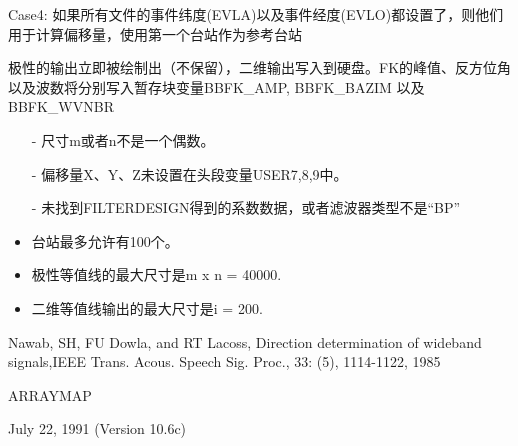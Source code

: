 Case4: 如果所有文件的事件纬度(EVLA)以及事件经度(EVLO)都设置了，则他们用于计算偏移量，使用第一个台站作为参考台站

极性的输出立即被绘制出（不保留），二维输出写入到硬盘。FK的峰值、反方位角以及波数将分别写入暂存块变量BBFK\_AMP, BBFK\_BAZIM 以及BBFK\_WVNBR

\begin{itemize}
\item[-]尺寸m或者n不是一个偶数。
\item[-]偏移量X、Y、Z未设置在头段变量USER7,8,9中。
\item[-]未找到FILTERDESIGN得到的系数数据，或者滤波器类型不是``BP''
\end{itemize}

\begin{itemize}
\item 台站最多允许有100个。
\item 极性等值线的最大尺寸是m x n = 40000.
\item 二维等值线输出的最大尺寸是i = 200.
\end{itemize}

Nawab, SH, FU Dowla, and RT Lacoss, Direction determination of wideband signals,IEEE Trans. Acous. Speech Sig. Proc., 33: (5), 1114-1122, 1985

ARRAYMAP

July 22, 1991 (Version 10.6c)
